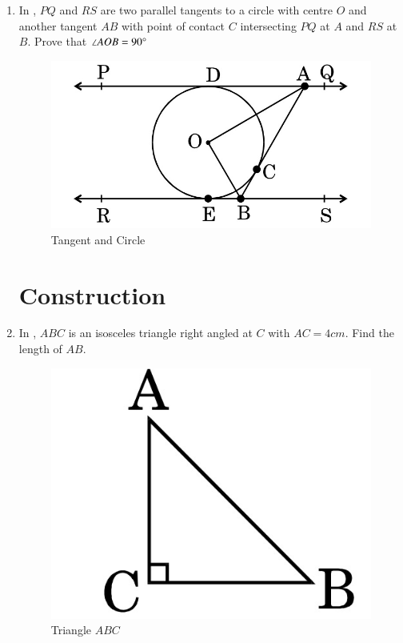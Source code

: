 \documentclass[2pt,-letter paper]{article}
\begin{document}
\begin{enumerate}
\item In  , $PQ$ and $RS$ are two parallel tangents to a circle with centre $O$ and another tangent $AB$ with point of contact $C$ intersecting $PQ$ at $A$ and $RS$ at $B$. Prove that $\angle AOB = 90 \degree$
\begin{figure}[H]
    \centering
    \includegraphics[width=\columnwidth]{img3.jpg}
    \caption{Tangent and Circle}
    \label{fig:Fig_3}
\end{figure}



\section{Construction}

 \item In  , $ABC$ is an isosceles triangle right angled at $C$ with $AC = 4 cm$. Find the length of $AB$.
\begin{figure}[H]
    \centering
    \includegraphics[width=\columnwidth]{img1.jpg}
    \caption{Triangle $ABC$}
    \label{fig:Fig_1}
\end{figure}


\end{enumerate}
\end{document}
